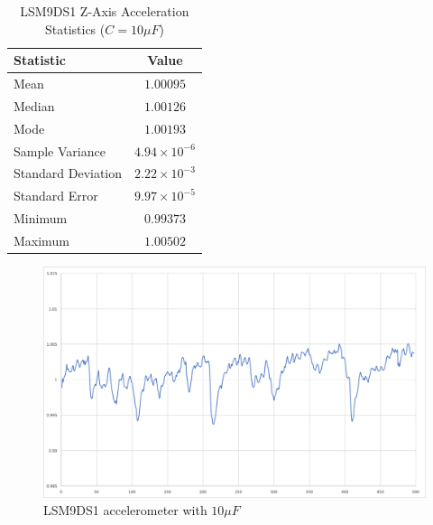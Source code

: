 \begin{table}[H]
\caption{\label{tab:10uF} LSM9DS1 Z-Axis Acceleration Statistics ($C=10\mu F$)}
\centering
\begin{tabular}{l|c}
\hline\hline
\textbf{Statistic}      & \textbf{Value}            \\\hline
Mean                    & $1.00095$                 \\\hline
Median                  & $1.00126$                 \\\hline
Mode  	                & $1.00193$                 \\\hline
Sample Variance         & $4.94\times10^{\minus6}$  \\\hline
Standard Deviation      & $2.22\times10^{\minus3}$  \\\hline
Standard Error  	    & $9.97\times10^{\minus5}$  \\\hline
Minimum                 & $0.99373$                 \\\hline
Maximum                 & $1.00502$                 \\\hline
\end{tabular}
\end{table}

\begin{figure}[ht]
  \centering
  \includegraphics[width=1.0\textwidth]{Controls/10uF.png}
  \caption{\label{fig:10uF} LSM9DS1 accelerometer with $10\mu F$}
\end{figure}

